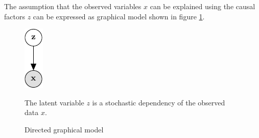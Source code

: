 



The assumption that the observed variables $x$ can be explained using the causal factors $z$ can be expressed as graphical model shown in figure \ref{fig:dgm}.

\begin{figure}[htb]
\centering
\includegraphics{media/directed_graphical_model}
  \caption{Directed graphical model}
  \label{fig:dgm}
  \medskip
  \small
  The latent variable $z$ is a stochastic dependency of the observed data $x$.
\end{figure}


\newpage













